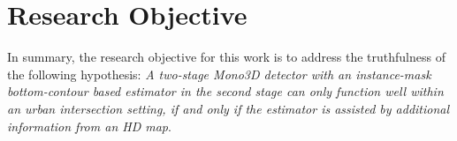 \section{Research Objective}
\label{sec:objective}

In summary, the research objective for this work is to address the truthfulness of the following hypothesis: \textit{A two-stage \textit{Mono3D} detector with an instance-mask bottom-contour based estimator in the second stage can only function well within an urban intersection setting, if and only if the estimator is assisted by additional information from an HD map}.
